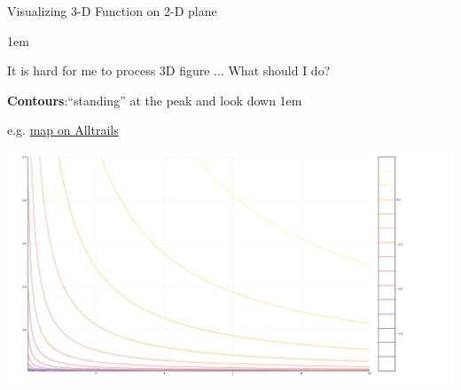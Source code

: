 \documentclass[11pt,aspectratio=43,usenames,dvipsnames]{beamer}
\let\olditemize=\itemize
\let\endolditemize=\enditemize
\renewenvironment{itemize}{\olditemize \itemsep1em}{\endolditemize}
\theoremstyle{definition}
\begin{document}
\begin{frame}{Visualizing 3-D Function on 2-D plane}
\label{slide:Visualizing_3_D_Function_on_2_D_plane}

    \begin{itemize}
        \item It is hard for me to process 3D figure \faFrownO...  What should I do?
        \item \textbf{Contours}:``standing'' at the peak and look down
        \begin{itemize}
            \item e.g. \alert{\href{https://www.alltrails.com/}{map on Alltrails}}
        \end{itemize}
    \end{itemize}

    \begin{center}
        \includegraphics[width=\textwidth]{./figures/utility_contour.png}
    \end{center}

\end{frame}
\end{document}
